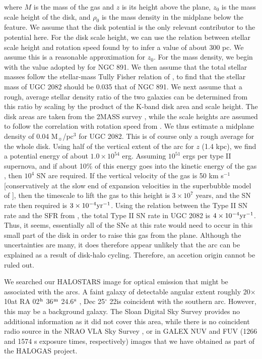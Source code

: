 \documentclass[useAMS,usenatbib]{mn2e}
\newcommand{\msun}{M$_{\sun}$}
\begin{document}
{where $M$ is the mass of the gas and $z$ is its height above the
plane, $z_0$ is the mass scale height of the disk, and $\rho_0$ is the
mass density in the midplane below the feature.  We assume that the
disk potential is the only relevant contributor to the potential here.
For the disk scale height, we can use the relation between stellar
scale height and rotation speed found by \citet{1999A&A...352..129V}
to infer a value of about 300 pc.  We assume this is a reasonable
approximation for $z_0$. For the mass density, we begin with the value adopted by \citet{1997AJ....114.2463H} for NGC 891.  We then assume that the total stellar masses follow the stellar-mass Tully Fisher relation of \citet*{2005MNRAS.358..503K}, to find that the stellar mass of UGC 2082 should be 0.035 that of NGC 891.  We next assume that a rough, average stellar density ratio of the two galaxies can be determined from this ratio by scaling by the product of the K-band disk area and scale height.  The disk areas are taken from the 2MASS survey \citep{2006AJ....131.1163S}, while the scale heights are assumed to follow the correlation with rotation speed from \citet{1999A&A...352..129V}.  We thus estimate a midplane density of 0.04 \msun/pc$^3$ for UGC 2082. This is of course only a rough average for the whole disk.  Using half
of the vertical extent of the arc for $z$ (1.4 kpc), we find a
potential energy of about $1.0 \times 10^{54}$ erg.  Assuming
$10^{51}$ ergs per type II supernova, and if about 10\% of this energy
goes into the kinetic energy of the gas \citep{1988ApJ...324..776M},
then $10^4$ SN are required.  If the vertical velocity of the gas is
50 km s$^{-1}$ [conservatively at the slow end of expansion velocities
  in the superbubble model of \citet*{1989ApJ...337..141M}], then the
timescale to lift the gas to this height is $3 \times 10^7$ years, and
the SN rate then required is $3 \times 10^{-4} {\rm yr}^{-1}$.  Using
the relation between the Type II SN rate and the SFR from
\citet{2011MNRAS.412.1508M}, the total Type II SN rate in UGC 2082 is
$4\times 10^{-4} {\rm yr}^{-1}$.  Thus, it seems, essentially all of
the SNe at this rate would need to occur in this small part of the
disk in order to raise this gas from the plane.  Although the
uncertainties are many, it does therefore appear unlikely that the arc
can be explained as a result of disk-halo cycling.  Therefore, an
accetion origin cannot be ruled out.
  
 We searched our HALOSTARS image for optical emission that might be associated with the arcs.  A faint galaxy of detectable angular extent roughly 20\arcsec $\times $10\arcsec at RA 02$^{\rm h}$ 36$^{\rm m}$  24.6$^{\rm s}$ , Dec 25$^{\circ}$ 22\arcsec is coincident with the southern arc.  However, this may be a background galaxy. The Sloan Digital Sky Survey provides no additional information as it did not cover this area, while there is no coincident radio source in the NRAO VLA Sky Survey \citep{1998AJ....115.1693C}, or in GALEX NUV and FUV (1266 and 1574 s exposure times, respectively) images that we have obtained as
part of the HALOGAS project.
}
\end{document}
